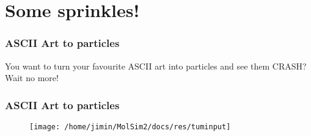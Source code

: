 
\section{Some sprinkles!}

\begin{frame}
    \frametitle{ASCII Art to particles}

    \center
    You want to turn your favourite ASCII art into particles and see them CRASH?
    \newline
    \newline
    \newline
    Wait no more! 

\end{frame}


\begin{frame}
    \frametitle{ASCII Art to particles}

    \begin{figure}[H]
        \texttt{[image: /home/jimin/MolSim2/docs/res/tuminput]}
    \end{figure}


\end{frame}
